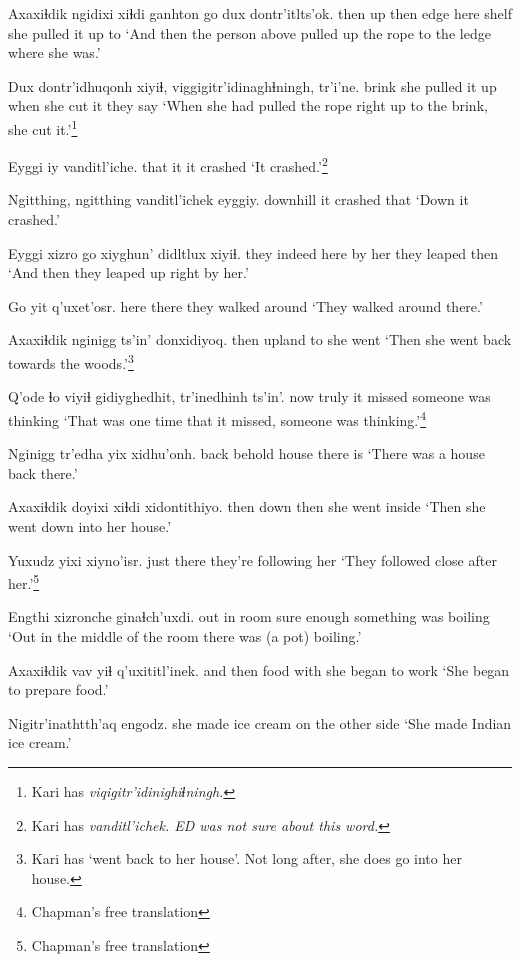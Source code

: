 \documentclass[12pt]{article}
\begin{document}
\gll Axaxiɬdik ngidixi xiɬdi ganhton go dux dontr'itlts'ok.
then  up then edge  here shelf {she pulled it up to} 
\glt `And then the person above pulled up the rope to the ledge where she was.'
\glend

\gll Dux dontr'idhuqonh xiyiɬ, viggigitr'idinaghɬningh, tr'i'ne.
brink {she pulled it up} when {she cut it} {they say} 
\glt `When she had pulled the rope right up to the brink, she cut it.'\footnote{Kari has \em viqigitr'idinighiɬningh.}
\glend

\gll Eyggi iy vanditl'iche.
that it {it crashed}
\glt `It crashed.'\footnote{Kari has \em vanditl'ichek. \em ED was not sure about this word.}
\glend

\gll Ngitthing, ngitthing vanditl'ichek eyggiy.
downhill  {}  {it crashed}  that
\glt `Down it crashed.'
\glend

\gll Eyggi xizro go xiyghun' didltlux xiyiɬ.
they  indeed here {by her} {they leaped} then
\glt `And then they leaped up right by her.'
\glend

\gll Go yit q'uxet'osr.
here there {they walked around}
\glt `They walked around there.'
\glend

\gll Axaxiɬdik nginigg ts'in' donxidiyoq.
then  upland   to {she went}
\glt `Then she went back towards the woods.'\footnote{Kari has `went back to her house'. Not long after, she does go into her house.}
\glend

\gll Q'ode ɬo {viyiɬ gidiyghedhit,} tr'inedhinh   ts'in'.
now truly {it missed} {someone was thinking}  
\glt `That was one time that it missed, someone was thinking.'\footnote{Chapman's free translation}
\glend

\gll Nginigg tr'edha yix xidhu'onh.
back  behold  house {there is}
\glt `There was a house back there.'
\glend

\gll Axaxiɬdik doyixi xiɬdi xidontithiyo.
then  down then {she went inside}
\glt `Then she went down into her house.'
\glend

\gll Yuxudz yixi xiyno'isr.
just there {they're following her}
\glt `They followed close after her.'\footnote{Chapman's free translation}
\glend

\gll Engthi xizronche ginaɬch'uxdi.
{out in room} {sure enough} {something was boiling}
\glt `Out in the middle of the room there was (a pot) boiling.'
\glend

\gll Axaxiɬdik vav yiɬ q'uxititl'inek.
{and then} food with {she began to work}
\glt `She began to prepare food.'
\glend

\gll Nigitr'inathtth'aq  engodz.
{she made ice cream} {on the other side}
\glt `She made Indian ice cream.'
\glend
\end{document}
